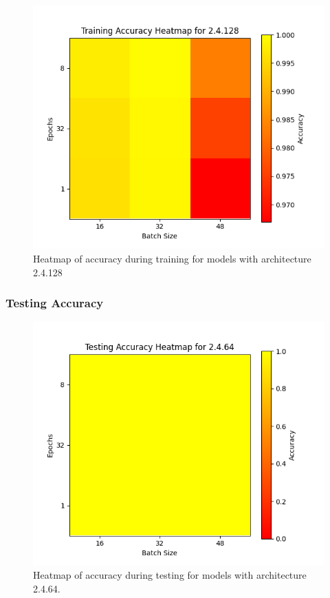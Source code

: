 \documentclass[12pt]{article}
\begin{document}
\begin{figure}[H]
\includegraphics[width=\textwidth]{heatmap_training_accuracy_2.4.128}
\centering
\caption{Heatmap of accuracy during training for models with architecture 2.4.128}
\label{fig:time-metrics}
\end{figure}



\subsubsection{Testing Accuracy}

\begin{figure}[H]
\includegraphics[width=\textwidth]{heatmap_testing_accuracy_2.4.64}
\centering
\caption{Heatmap of accuracy during testing for models with architecture 2.4.64.}
\label{fig:time-metrics}
\end{figure}
\end{document}
